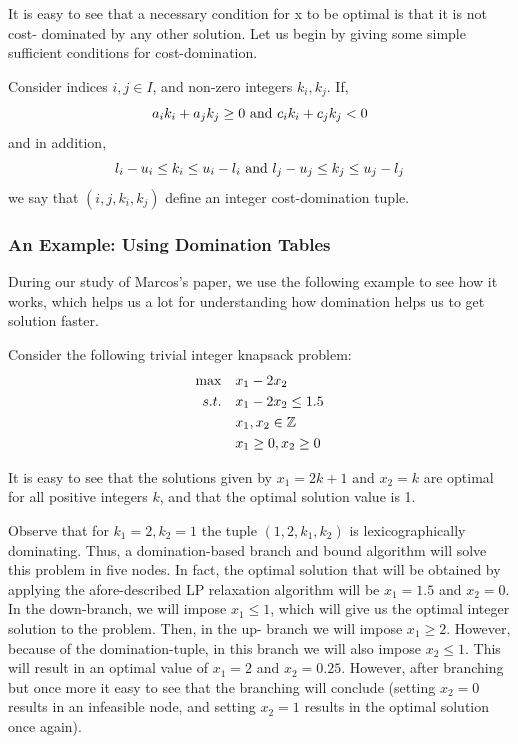 \documentclass[a4paper,11pt]{article}
\begin{document}
It is easy to see that a necessary condition for x to be optimal is that it is not cost- dominated by any other solution. Let us begin by giving some simple sufficient conditions for cost-domination.

\begin{definition}
Consider indices $i,j\in I$, and non-zero integers $k_i, k_j$. If,
\begin{equation}
a_ik_i+a_jk_j\geq 0 ~\mbox{and}~ c_ik_i+c_jk_j <0
\end{equation}
and in addition,
\begin{equation}
l_i-u_i\leq k_i \leq u_i-l_i ~\mbox{and}~ l_j-u_j\leq k_j \leq u_j-l_j 
\end{equation}
we say that $(i,j,k_i,k_j)$ define an integer cost-domination tuple.
\end{definition}


\subsubsection{An Example: Using Domination Tables }

During our study of Marcos's paper, we use the following example to see how it works, which helps us a lot for understanding how domination helps us to get solution faster.

Consider the following trivial integer knapsack problem:
\begin{align}
\max \quad&x_1-2x_2\\
s.t. \quad & x_1-2x_2\leq1.5\notag\\
& x_1, x_2\in \mathbb Z \notag\\
& x_1 \geq0, x_2 \geq 0\notag
\end{align}

It is easy to see that the solutions given by $x_1 = 2k+1$ and $x_2 = k$ are optimal for all positive integers $k$, and that the optimal solution value is 1.

Observe that for $k_1 = 2, k_2 = 1$ the tuple $(1, 2, k_1, k_2)$ is lexicographically dominating. Thus, a domination-based branch and bound algorithm will solve this problem in five nodes. In fact, the optimal solution that will be obtained by applying the afore-described LP relaxation algorithm will be $x_1 = 1.5$ and $x_2 = 0$. In the down-branch, we will impose $x_1\leq1$, which will give us the optimal integer solution to the problem. Then, in the up- branch we will impose $x_1\geq 2$. However, because of the domination-tuple, in this branch we will also impose $x_2 \leq 1$. This will result in an optimal value of $x_1 = 2$ and $x_2 = 0.25$. However, after branching but once more it easy to see that the branching will conclude (setting $x_2 = 0$ results in an infeasible node, and setting $x_2 = 1$ results in the optimal solution once again).
 
\end{document}
